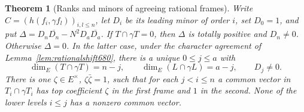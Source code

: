\documentclass[a4paper,11pt]{article}
\newtheorem{theorem}[proposition]{Theorem}
\theoremstyle{definition}
\theoremstyle{remark}
\numberwithin{equation}{section}
\begin{document}
\begin{theorem}[Ranks and minors of agreeing rational frames]
\leavevmode\label{thm:rationalflags680}
Write \(C=(h(f_i,\gamma f_l))_{i,l\le n}\), let \(D_i\) be its
leading minor of order \(i\), set \(D_0=1\), and put
\(\Delta=D_n\overline{D_n}-N^2D_a\overline{D_a}\).
If \(T\cap\gamma T=0\), then \(\Delta\) is totally positive and
\(D_n\ne0\). Otherwise \(\Delta=0\). In the latter case, under
the character agreement of Lemma~\ref{lem:rationalshift680},
there is a unique \(0\le j\le a\) with
\[
 \dim_E(T\cap\gamma T)=n-j,\qquad
 \dim_E(L\cap\gamma L)=a-j,\qquad D_j\ne0.
\]
There is one \(\zeta\in E^\times\), \(\zeta\bar\zeta=1\), such
that for each \(j<i\le n\) a common vector in
\(T_i\cap\gamma T_i\) has top coefficient \(\zeta\) in the first
frame and \(1\) in the second. None of the lower levels \(i\le j\)
has a nonzero common vector.
\end{theorem}
\end{document}
